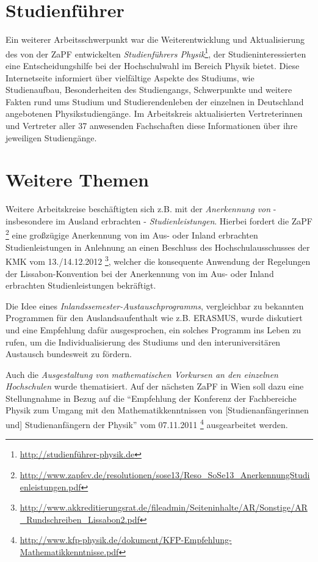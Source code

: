 \documentclass{scrartcl}
\begin{document}
\section*{Studienführer}
Ein weiterer Arbeitsschwerpunkt war die Weiterentwicklung und Aktualisierung des von der ZaPF entwickelten \emph{Studienführers Physik}\footnote{\href{http://studienführer-physik.de}{\url{http://studienführer-physik.de}}}, der Studieninteressierten eine Entscheidungshilfe bei der Hochschulwahl im Bereich Physik bietet. Diese Internetseite informiert über vielfältige Aspekte des Studiums, wie Studienaufbau, Besonderheiten des Studiengangs, Schwerpunkte und weitere Fakten rund ums Studium und Studierendenleben der einzelnen in Deutschland angebotenen Physikstudiengänge. Im Arbeitskreis aktualisierten Vertreterinnen und Vertreter aller 37 anwesenden Fachschaften diese Informationen über ihre jeweiligen Studiengänge.

\section*{Weitere Themen}
Weitere Arbeitskreise beschäftigten sich z.B. mit der \emph{Anerkennung von} - insbesondere im Ausland erbrachten - \emph{Studienleistungen}. Hierbei fordert die ZaPF \footnote{\href{http://www.zapfev.de/resolutionen/sose13/Reso\_SoSe13\_AnerkennungStudienleistungen.pdf}{\url{http://www.zapfev.de/resolutionen/sose13/Reso\_SoSe13\_AnerkennungStudienleistungen.pdf}}} eine großzügige Anerkennung von im Aus- oder Inland erbrachten Studienleistungen in Anlehnung an einen Beschluss des Hochschulausschusses der KMK vom 13./14.12.2012 \footnote{\href{http://www.akkreditierungsrat.de/fileadmin/Seiteninhalte/AR/Sonstige/AR\_Rundschreiben\_Lissabon2.pdf}{\url{http://www.akkreditierungsrat.de/fileadmin/Seiteninhalte/AR/Sonstige/AR\_Rundschreiben\_Lissabon2.pdf}}}, welcher die konsequente Anwendung der Regelungen der Lissabon-Konvention bei der Anerkennung von im Aus- oder Inland erbrachten Studienleistungen bekräftigt.

Die Idee eines \emph{Inlandssemester-Austauschprogramms}, vergleichbar zu bekannten Programmen für den Auslandsaufenthalt wie z.B. ERASMUS, wurde diskutiert und eine Empfehlung dafür ausgesprochen, ein solches Programm ins Leben zu rufen, um die Individualisierung des Studiums und den interuniversitären Austausch bundesweit zu fördern.

Auch die \emph{Ausgestaltung von mathematischen Vorkursen an den einzelnen Hochschulen} wurde thematisiert. Auf der nächsten ZaPF in Wien soll dazu eine Stellungnahme in Bezug auf die "`Empfehlung der Konferenz der Fachbereiche Physik zum Umgang mit den Mathematikkenntnissen von [Studienanfängerinnen und] Studienanfängern der Physik"' vom 07.11.2011 \footnote{\href{http://www.kfp-physik.de/dokument/KFP-Empfehlung-Mathematikkenntnisse.pdf}{\url{http://www.kfp-physik.de/dokument/KFP-Empfehlung-Mathematikkenntnisse.pdf}}} ausgearbeitet werden.
\end{document}
